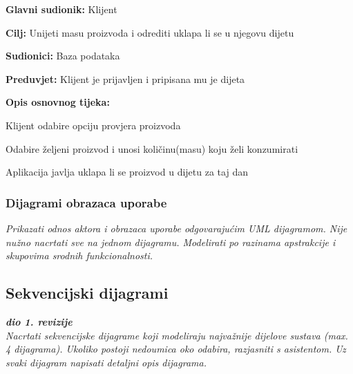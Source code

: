 					\noindent {}
					\begin{packed_item}
						
						\item \textbf{Glavni sudionik:} Klijent
						\item  \textbf{Cilj:} Unijeti masu proizvoda i odrediti uklapa li se u njegovu dijetu
						\item  \textbf{Sudionici:} Baza podataka
						\item  \textbf{Preduvjet:} Klijent je prijavljen i pripisana mu je dijeta
						\item  \textbf{Opis osnovnog tijeka:}
						
						\item[] \begin{packed_enum}
							
							\item Klijent odabire opciju provjera proizvoda
							\item Odabire željeni proizvod i unosi količinu(masu) koju želi konzumirati
							\item Aplikacija javlja uklapa li se proizvod u dijetu za taj dan
							
						\end{packed_enum}
						
						
					\end{packed_item}
				
					
					
				\subsubsection{Dijagrami obrazaca uporabe}
					
					\textit{Prikazati odnos aktora i obrazaca uporabe odgovarajućim UML dijagramom. Nije nužno nacrtati sve na jednom dijagramu. Modelirati po razinama apstrakcije i skupovima srodnih funkcionalnosti.}
				\eject		
				
			\subsection{Sekvencijski dijagrami}
				
				\textbf{\textit{dio 1. revizije}}\\
				
				\textit{Nacrtati sekvencijske dijagrame koji modeliraju najvažnije dijelove sustava (max. 4 dijagrama). Ukoliko postoji nedoumica oko odabira, razjasniti s asistentom. Uz svaki dijagram napisati detaljni opis dijagrama.}
				\eject
	
